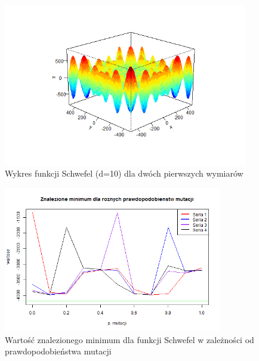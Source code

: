 \documentclass[11pt, a4paper]{article}
\begin{document}
\begin{figure}[H]
	\begin{center}
		\includegraphics[width=0.95\textwidth]{./assets/Schwefel1.png}
		\caption{Wykres funkcji Schwefel (d=10) dla dwóch pierwszych wymiarów}
		\label{fig:schwefel1}
	\end{center}
\end{figure}

\begin{figure}[H]
	\begin{center}
		\includegraphics[width=0.85\textwidth]{./assets/Schwefel2.png}
		\caption{Wartość znalezionego minimum dla funkcji Schwefel w zależności od prawdopodobieństwa mutacji}
		\label{fig:schwefel2}
	\end{center}
\end{figure}
\end{document}
